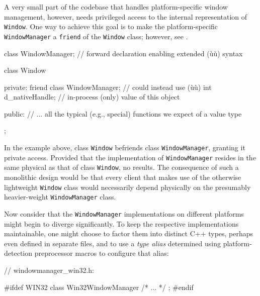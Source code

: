 A very small part of the codebase that handles platform-specific window
management, however, needs privileged access to the internal
representation of \lstinline!Window!. One way to achieve this goal is to
make the platform-specific \lstinline!WindowManager! a \lstinline!friend! of
the \lstinline!Window! class; however, see . 

\begin{emcppslisting}
class WindowManager;  // forward declaration enabling extended (ù{}ù) syntax

class Window
{
private:
    friend class WindowManager;  // could instead use (ù{}ù)
    int d_nativeHandle;          // in-process (only) value of this object

public:
    // ... all the typical (e.g., special) functions we expect of a value type
};
\end{emcppslisting}
    
\noindent In the example above, class \lstinline!Window! befriends class
\lstinline!WindowManager!, granting it private access. Provided that the
implementation of \lstinline!WindowManager! resides in the same physical
 as that of class \lstinline!Window!, no
 results. The consequence of such a
monolithic design would be that every client that makes use of the
otherwise lightweight \lstinline!Window! class would necessarily depend
physically on the presumably heavier-weight \lstinline!WindowManager! class.

Now consider that the \lstinline!WindowManager! implementations on
different platforms might begin to diverge significantly. To keep the
respective implementations maintainable, one might choose to factor them
into distinct C++ types, perhaps even defined in separate files, and to
use a \emph{type alias} determined using platform-detection preprocessor
macros to configure that alias:


\begin{emcppslisting}[emcppsbatch=e1]
// windowmanager_win32.h:

#ifdef WIN32
class Win32WindowManager { /* ... */ };
#endif
\end{emcppslisting}

